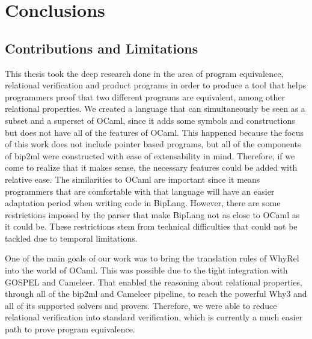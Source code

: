 
%

\chapter{Conclusions}
\label{cha:conclusion}

\section{Contributions and Limitations}
\label{sec:contributions_limitations}

This thesis took the deep research done in the area of program equivalence, relational verification and product programs in order to produce a tool that helps programmers proof that two different programs are equivalent, among other relational properties.
We created a language that can simultaneously be seen as a subset and a superset of OCaml, since it adds some symbols and constructions but does not have all of the features of OCaml.
This happened because the focus of this work does not include pointer based programs, but all of the components of bip2ml were constructed with ease of extensability in mind. 
Therefore, if we come to realize that it makes sense, the necessary features could be added with relative ease.
The similarities to OCaml are important since it means programmers that are comfortable with that language will have an easier adaptation period when writing code in BipLang.
However, there are some restrictions imposed by the parser that make BipLang not as close to OCaml as it could be.
These restrictions stem from technical difficulties that could not be tackled due to temporal limitations.

One of the main goals of our work was to bring the translation rules of WhyRel into the world of OCaml.
This was possible due to the tight integration with GOSPEL and Cameleer.
That enabled the reasoning about relational properties, through all of the bip2ml and Cameleer pipeline, to reach the powerful Why3 and all of its supported solvers and provers.
Therefore, we were able to reduce relational verification into standard verification, which is currently a much easier path to prove program equivalence.


